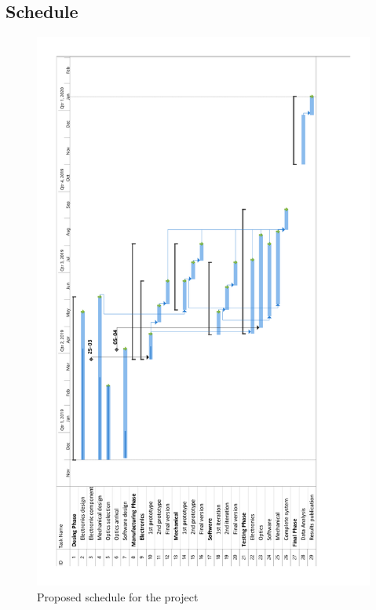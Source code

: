 \begin{landscape}

\subsection{Schedule}
\begin{figure}[H]

\includegraphics[scale=0.65,angle=270]{3-project-planning/img/Gantt1.pdf}
\caption{Proposed schedule for the project}
\label{GanttChart}
\end{figure}

\end{landscape}
